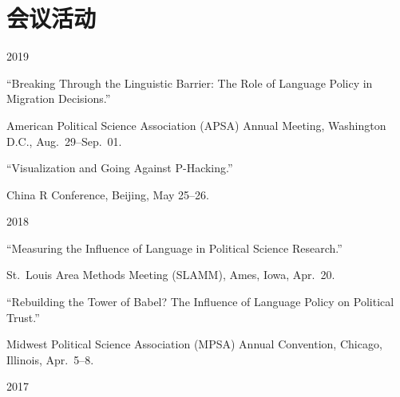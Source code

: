 \documentclass[10.5pt,]{article}
\providecommand{\tightlist}{%
	\setlength{\itemsep}{0pt}\setlength{\parskip}{0pt}}
\renewenvironment{itemize}{
	\begin{list}{}{
			\setlength{\leftmargin}{1.5em}
		}
	}{
	\end{list}
}
\begin{document}
\hypertarget{ux4f1aux8baeux6d3bux52a8}{%
\section{会议活动}\label{ux4f1aux8baeux6d3bux52a8}}

\begin{itemize}
\tightlist
\item
  2019

  \begin{itemize}
  \tightlist
  \item
    ``Breaking Through the Linguistic Barrier: The Role of Language
    Policy in Migration Decisions.''

    \begin{itemize}
    \tightlist
    \item
      \footnotesize American Political Science Association (APSA) Annual
      Meeting, Washington D.C., Aug.~29--Sep.~01.
    \end{itemize}
  \item
    ``Visualization and Going Against P-Hacking.''

    \begin{itemize}
    \tightlist
    \item
      \footnotesize China R Conference, Beijing, May 25--26.
    \end{itemize}
  \end{itemize}
\item
  2018

  \begin{itemize}
  \tightlist
  \item
    ``Measuring the Influence of Language in Political Science
    Research.''

    \begin{itemize}
    \tightlist
    \item
      \footnotesize St.~Louis Area Methods Meeting (SLAMM), Ames, Iowa,
      Apr.~20.
    \end{itemize}
  \item
    ``Rebuilding the Tower of Babel? The Influence of Language Policy on
    Political Trust.''

    \begin{itemize}
    \tightlist
    \item
      \footnotesize Midwest Political Science Association (MPSA) Annual
      Convention, Chicago, Illinois, Apr.~5--8.
    \end{itemize}
  \end{itemize}
\item
  2017


\end{itemize}
\end{document}
